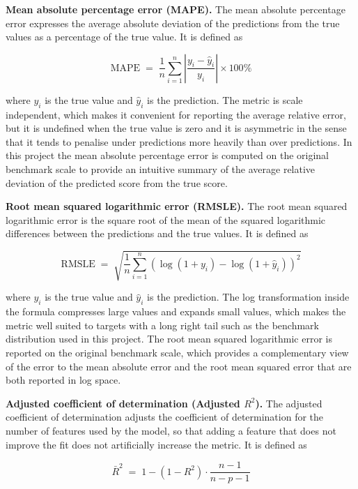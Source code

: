 \documentclass[12pt]{report}
\numberwithin{figure}{chapter}
\numberwithin{table}{chapter}
\numberwithin{equation}{chapter}
\begin{document}
\textbf{Mean absolute percentage error (MAPE).} The mean absolute percentage error expresses the average absolute deviation of the predictions from the true values as a percentage of the true value. It is defined as

\begin{equation}
\text{MAPE} \;=\; \frac{1}{n} \sum_{i=1}^{n} \left| \frac{y_i - \hat{y}_i}{y_i} \right| \times 100\%
\label{eq:mape}
\end{equation}

\noindent where $y_i$ is the true value and $\hat{y}_i$ is the prediction. The metric is scale independent, which makes it convenient for reporting the average relative error, but it is undefined when the true value is zero and it is asymmetric in the sense that it tends to penalise under predictions more heavily than over predictions. In this project the mean absolute percentage error is computed on the original benchmark scale to provide an intuitive summary of the average relative deviation of the predicted score from the true score.

\textbf{Root mean squared logarithmic error (RMSLE).} The root mean squared logarithmic error is the square root of the mean of the squared logarithmic differences between the predictions and the true values. It is defined as

\begin{equation}
\text{RMSLE} \;=\; \sqrt{\frac{1}{n} \sum_{i=1}^{n} \left( \log(1 + y_i) - \log(1 + \hat{y}_i) \right)^{2}}
\label{eq:rmsle}
\end{equation}

\noindent where $y_i$ is the true value and $\hat{y}_i$ is the prediction. The log transformation inside the formula compresses large values and expands small values, which makes the metric well suited to targets with a long right tail such as the benchmark distribution used in this project. The root mean squared logarithmic error is reported on the original benchmark scale, which provides a complementary view of the error to the mean absolute error and the root mean squared error that are both reported in log space.

\textbf{Adjusted coefficient of determination (Adjusted $R^{2}$).} The adjusted coefficient of determination adjusts the coefficient of determination for the number of features used by the model, so that adding a feature that does not improve the fit does not artificially increase the metric. It is defined as

\begin{equation}
\bar{R}^{2} \;=\; 1 - \left( 1 - R^{2} \right) \cdot \frac{n - 1}{n - p - 1}
\label{eq:adj-r2}
\end{equation}
\end{document}
